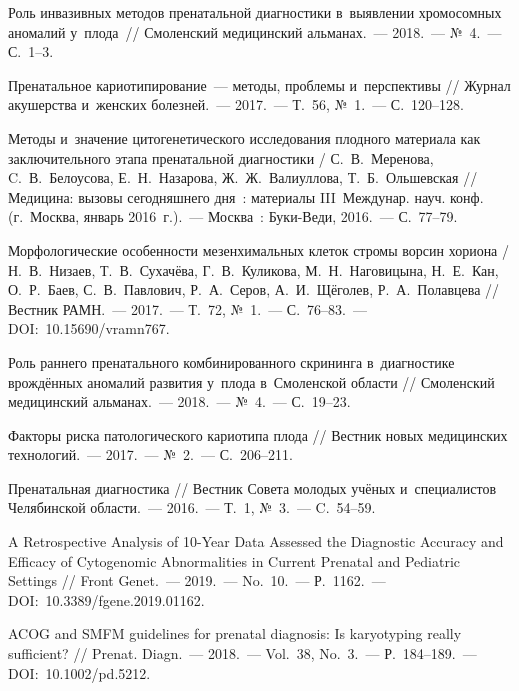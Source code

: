 \begin{thebibliography}{99}
\bibitem{} Роль инвазивных методов пренатальной диагностики в~выявлении хромосомных аномалий у~плода~// Смоленский медицинский альманах.~--- 2018.~--- №~4.~--- С.~1--3.

\bibitem{} Пренатальное кариотипирование~--- методы, проблемы и~перспективы // Журнал акушерства и~женских болезней.~--- 2017.~--- Т.~56, №~1.~--- С.~120--128.

\bibitem{} Методы и~значение цитогенетического исследования плодного материала как заключительного этапа пренатальной диагностики / С.~В.~Меренова, C.~В.~Белоусова,  Е.~Н.~Назарова, Ж.~Ж.~Валиуллова, Т.~Б.~Ольшевская // Медицина: вызовы сегодняшнего дня~: материалы III~Междунар. науч. конф. (г.~Москва, январь 2016~г.).~--- Москва~: Буки-Веди, 2016.~--- С.~77--79.

\bibitem{} Морфологические особенности мезенхимальных клеток стромы ворсин хориона / Н.~В.~Низаев, Т.~В.~Сухачёва, Г.~В.~Куликова, М.~Н.~Наговицына, Н.~Е.~Кан, О.~Р.~Баев, С.~В.~Павлович, Р.~А.~Серов, А.~И.~Щёголев, Р.~А.~Полавцева // Вестник РАМН.~--- 2017.~--- Т.~72, №~1.~--- С.~76--83.~--- DOI:~10.15690/vramn767.

\bibitem{} Роль раннего пренатального комбинированного скрининга в~диагностике врождённых аномалий развития у~плода в~Смоленской области // Смоленский медицинский альманах.~--- 2018.~--- №~4.~--- С.~19--23.

\bibitem{} Факторы риска патологического кариотипа плода // Вестник новых медицинских технологий.~--- 2017.~--- №~2.~--- С.~206--211.

\bibitem{} Пренатальная диагностика // Вестник Совета молодых учёных и~специалистов Челябинской области.~--- 2016.~--- Т.~1, №~3.~--- C.~54--59.

\bibitem{} A Retrospective Analysis of 10-Year Data Assessed the Diagnostic Accuracy and Efficacy of Cytogenomic Abnormalities in Current Prenatal and Pediatric Settings //  Front Genet.~--- 2019.~--- No.~10.~--- Р.~1162.~--- DOI:~10.3389/fgene.2019.01162.

\bibitem{} ACOG and SMFM guidelines for prenatal diagnosis: Is karyotyping really sufficient? // Prenat. Diagn.~--- 2018.~--- Vol.~38, No.~3.~--- Р.~184--189.~--- DOI:~10.1002/pd.5212.


\end{thebibliography}
